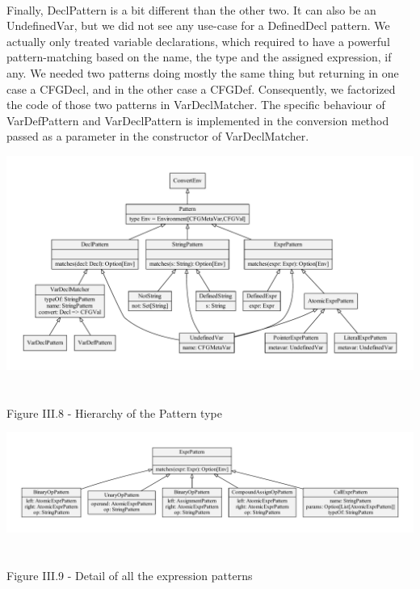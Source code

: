 \documentclass{report}
\begin{document}
\paragraph{}
\hspace{4mm}Finally, DeclPattern is a bit different than the other two. It can also be an UndefinedVar, but we did not see any use-case for a DefinedDecl pattern. 
We actually only treated variable declarations, which required to have a powerful pattern-matching based on the name, the type and the assigned expression, if any.
We needed two patterns doing mostly the same thing but returning in one case a CFGDecl, and in the other case a CFGDef. Consequently, we factorized the code of those two patterns
in VarDeclMatcher. The specific behaviour of VarDefPattern and VarDeclPattern is implemented in the conversion method passed as a parameter in the constructor of VarDeclMatcher.

\begin{center}
\includegraphics[scale=0.55]{data/patterns}
~\\~\\Figure III.8 - Hierarchy of the Pattern type
\end{center}

\begin{center}
\includegraphics[scale=0.45]{data/expr_pattern}
~\\~\\Figure III.9 - Detail of all the expression patterns
\end{center}
\end{document}

